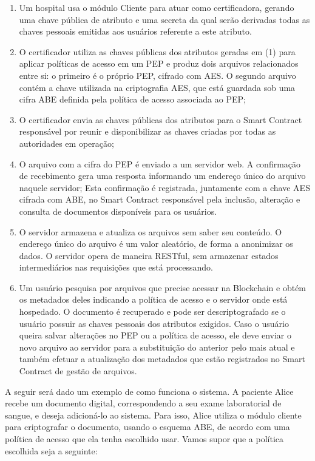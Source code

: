 \documentclass[a4paper,11pt]{article}
\begin{document}
\begin{enumerate}[label=(\arabic*)]
  \item Um hospital usa o módulo Cliente para atuar como certificadora, gerando uma chave pública de atributo e uma secreta da qual serão derivadas todas as chaves pessoais emitidas aos usuários referente a este atributo.
  \item O certificador utiliza as chaves públicas dos atributos geradas em (1) para aplicar políticas de acesso em um PEP e produz dois arquivos relacionados entre si:
  o primeiro é o próprio PEP, cifrado com AES.
  O segundo arquivo contém a chave utilizada na criptografia AES, que está guardada sob uma cifra ABE definida pela política de acesso associada ao PEP;%
  \item O certificador envia as chaves públicas dos atributos para o Smart Contract responsável por reunir e disponibilizar as chaves criadas por todas as autoridades em operação;
  \item O arquivo com a cifra do PEP é enviado a um servidor web.
  A confirmação de recebimento gera uma resposta informando um endereço único do arquivo naquele servidor;
  Esta confirmação é registrada, juntamente com a chave AES cifrada com ABE, no Smart Contract responsável pela inclusão, alteração e consulta de documentos disponíveis para os usuários. %
  \item O servidor armazena e atualiza os arquivos sem saber seu conteúdo.
  O endereço único do arquivo é um valor aleatório, de forma a anonimizar os dados.
  O servidor opera de maneira RESTful, sem armazenar estados intermediários nas requisições que está processando.
  \item Um usuário pesquisa por arquivos que precise acessar na Blockchain e obtém os metadados deles indicando a política de acesso e o servidor onde está hospedado.
  O documento é recuperado e pode ser descriptografado se o usuário possuir as chaves pessoais dos atributos exigidos.
  Caso o usuário queira salvar alterações no PEP ou a política de acesso, ele deve enviar o novo arquivo ao servidor para a substituição do anterior pelo mais atual e também efetuar a atualização dos metadados que estão registrados no Smart Contract de gestão de arquivos.
\end{enumerate}

A seguir será dado um exemplo de como funciona o sistema.
A paciente Alice recebe um documento digital, correspondendo a seu exame laboratorial de sangue, e deseja adicioná-lo ao sistema.
Para isso, Alice %
utiliza o módulo cliente para criptografar o documento, usando o esquema ABE, de acordo com uma política de acesso que ela tenha escolhido usar.
Vamos supor que a política escolhida seja a seguinte:
\end{document}
